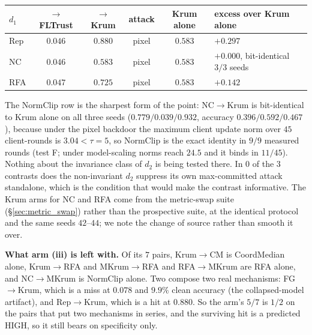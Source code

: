 \documentclass{article}
\begin{document}
\begin{center}
\begin{tabular}{lccccl}
\toprule
$d_1$ & $\to$FLTrust & $\to$Krum & attack & Krum alone & excess over Krum alone \\
\midrule
Rep & $0.046$ & $0.880$ & pixel & $0.583$ & $+0.297$ \\
NC & $0.046$ & $0.583$ & pixel & $0.583$ & $+0.000$, bit-identical $3/3$ seeds \\
RFA & $0.047$ & $0.725$ & pixel & $0.583$ & $+0.142$ \\
\bottomrule
\end{tabular}
\end{center}

The NormClip row is the sharpest form of the point: NC$\to$Krum is bit-identical to Krum alone on all three seeds ($0.779 / 0.039 / 0.932$, accuracy $0.396 / 0.592 / 0.467$), because under the pixel backdoor the maximum client update norm over $45$ client-rounds is $3.04 < \tau{=}5$, so NormClip is the exact identity in $9/9$ measured rounds (test F; under model-scaling norms reach $24.5$ and it binds in $11/45$). Nothing about the invariance class of $d_2$ is being tested there. In $0$ of the $3$ contrasts does the non-invariant $d_2$ suppress its own max-committed attack standalone, which is the condition that would make the contrast informative. The Krum arms for NC and RFA come from the metric-swap suite (§\ref{sec:metric_swap}) rather than the prospective suite, at the identical protocol and the same seeds $42$--$44$; we note the change of source rather than smooth it over.

\textbf{What arm (iii) is left with.} Of its $7$ pairs, Krum$\to$CM is CoordMedian alone, Krum$\to$RFA and MKrum$\to$RFA and RFA$\to$MKrum are RFA alone, and NC$\to$MKrum is NormClip alone. Two compose two real mechanisms: FG$\to$Krum, which is a miss at $0.078$ and $9.9\%$ clean accuracy (the collapsed-model artifact), and Rep$\to$Krum, which is a hit at $0.880$. So the arm's $5/7$ is $1/2$ on the pairs that put two mechanisms in series, and the surviving hit is a predicted HIGH, so it still bears on specificity only.
\end{document}
